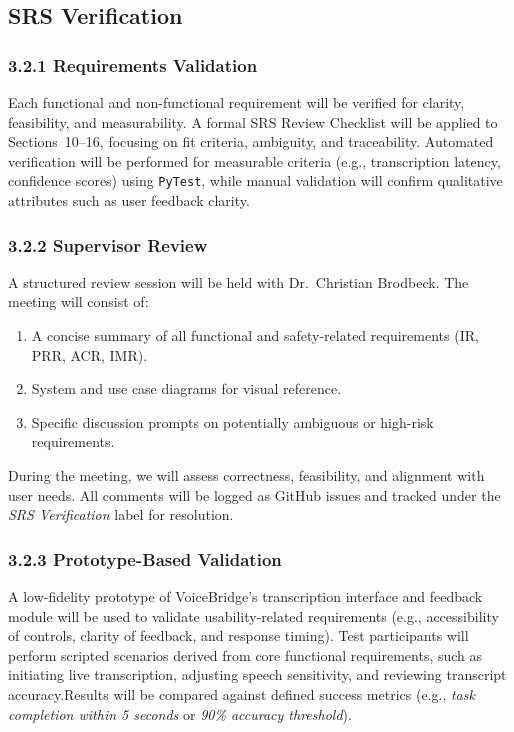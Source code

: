 \documentclass[12pt, titlepage]{article}
\begin{document}
\subsection{SRS Verification}

\subsubsection*{3.2.1 Requirements Validation}
Each functional and non-functional requirement will be verified for clarity, feasibility, and measurability. A formal SRS Review Checklist will be applied to Sections~10--16, focusing on fit criteria, ambiguity, and traceability. Automated verification will be performed for measurable criteria (e.g., transcription latency, confidence scores) using \texttt{PyTest}, while manual validation will confirm qualitative attributes such as user feedback clarity.

\subsubsection*{3.2.2 Supervisor Review}
A structured review session will be held with Dr.~Christian Brodbeck. The meeting will consist of:

\begin{enumerate}
    \item A concise summary of all functional and safety-related requirements (IR, PRR, ACR, IMR).
    \item System and use case diagrams for visual reference.
    \item Specific discussion prompts on potentially ambiguous or high-risk requirements.
\end{enumerate}

During the meeting, we will assess correctness, feasibility, and alignment with user needs. All comments will be logged as GitHub issues and tracked under the \textit{SRS Verification} label for resolution.

\subsubsection*{3.2.3 Prototype-Based Validation}
A low-fidelity prototype of VoiceBridge’s transcription interface and feedback module will be used to validate usability-related requirements (e.g., accessibility of controls, clarity of feedback, and response timing). Test participants will perform scripted scenarios derived from core functional requirements, such as initiating live transcription, adjusting speech sensitivity, and reviewing transcript accuracy.Results will be compared against defined success metrics (e.g., \textit{task completion within 5 seconds} or \textit{90\% accuracy threshold}).
\end{document}
